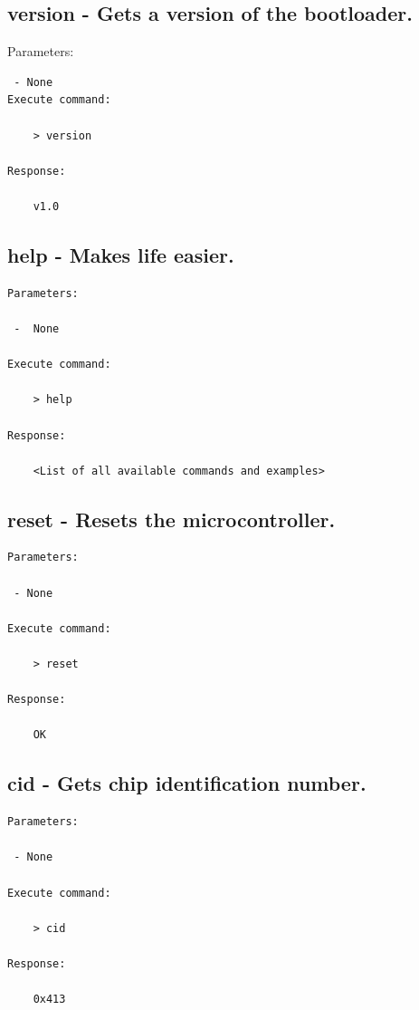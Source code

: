 \subsection{version - Gets a version of the bootloader.}
\label{bl_cmd:version}

Parameters:
\begin{lstlisting}
 - None
Execute command: 

    > version  
    
Response: 

    v1.0  
\end{lstlisting}
    
    
\subsection{help - Makes life easier.}
\label{bl_cmd:help}

\begin{lstlisting}
Parameters:

 -  None

Execute command: 

    > help  
    
Response: 

    <List of all available commands and examples>
\end{lstlisting}

\subsection{reset - Resets the microcontroller.}
\label{bl_cmd:reset}

\begin{lstlisting}
Parameters:

 - None

Execute command: 

    > reset
    
Response: 

    OK
\end{lstlisting}


\subsection{cid - Gets chip identification number.}
\label{bl_cmd:cid}

\begin{lstlisting}
Parameters:

 - None

Execute command: 

    > cid  
    
Response: 

    0x413
\end{lstlisting}


